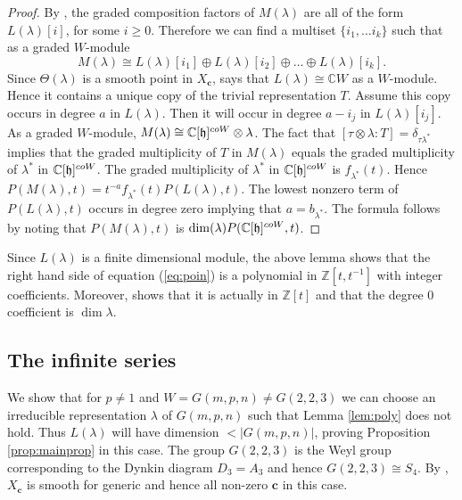 \documentclass[a4apper,10pt]{amsart}
\theoremstyle{definition}
\numberwithin{thm}{section}
\newcommand{\Z}{\mathbb{Z}}
\newcommand{\C}{\mathbb{C}}
\begin{document}
\begin{proof}
By \cite[Lemma 4.4, paragraphs (5.2) and (5.4)]{6}, the graded composition factors of $M(\lambda)$ are all of the form $L(\lambda)[i]$, for some $i \ge 0$. Therefore we can find a multiset $\{ i_1, \dots i_k \}$ such that as a graded $W$-module
\begin{displaymath}
M(\lambda) \cong L(\lambda)[i_1] \oplus L(\lambda)[i_2] \oplus \dots \oplus L(\lambda)[i_k].
\end{displaymath}
Since $\Theta(\lambda)$ is a smooth point in $X_{\mathbf{c}}$, \cite[Theorem 1.7]{1} says that $L(\lambda) \cong \C W$ as a $W$-module. Hence it contains a unique copy of the trivial representation $T$. Assume this copy occurs in degree $a$ in
$L(\lambda)$. Then it will occur in degree $a - i_j$ in
$L(\lambda)[i_j]$. As a graded $W$-module, $M(\lambda) \cong
\C[\frak{h}]^{coW}\otimes \lambda$. The fact that $[\tau \otimes
  \lambda : T] = \delta_{\tau\lambda^*}$ implies that the graded
multiplicity of $T$ in $M(\lambda)$ equals the graded multiplicity of
$\lambda^*$ in $\C[\frak{h}]^{coW}$. The graded multiplicity of
$\lambda^*$ in $\C[\frak{h}]^{coW}$ is $f_{\lambda^*}(t)$. Hence
$P(M(\lambda),t) = t^{-a}f_{\lambda^*}(t)P(L(\lambda),t)$. The lowest
nonzero term of $P(L(\lambda),t)$ occurs in degree zero implying that $a = b_{\lambda^*}$. The formula follows by noting that $P(M(\lambda),t)$ is $\dim (\lambda) P(\C[\frak{h}]^{coW},t)$.
\end{proof} 

\noindent Since $L(\lambda)$ is a finite dimensional module, the above lemma shows that the right hand side of equation (\ref{eq:poin}) is a polynomial in $\Z[t,t^{-1}]$ with integer coefficients. Moreover, \cite[Lemma 4.4]{6} shows that it is actually in $\Z[t]$ and that the degree 0 coefficient is $\dim \lambda$.\\

\subsection{The infinite series}
We show that for $p \neq 1$ and $W = G(m,p,n) \neq G(2,2,3)$ we can choose an irreducible representation $\lambda$ of $G(m,p,n)$ such that Lemma \ref{lem:poly} does not hold. Thus $L(\lambda)$ will have dimension $< |G(m,p,n)|$, proving Proposition \ref{prop:mainprop} in this case. The group $G(2,2,3)$ is the Weyl group corresponding to the Dynkin diagram $D_3 = A_3$ and hence $G(2,2,3) \cong S_4$. By \cite[Corollory 16.2]{1}, $X_{\mathbf{c}}$ is smooth for generic and hence all non-zero $\mathbf{c}$ in this case.\\
\end{document}
